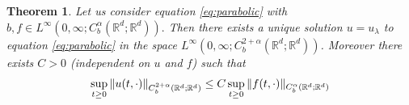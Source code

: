 \documentclass[a4paper,11pt]{article}
\newtheorem{theorem}{Theorem}
\begin{document}
\begin{theorem}
\label{schaud} Let us consider equation \eqref{eq:parabolic} with $b,f\in
L^{\infty }\left( 0,\infty ;C_{b}^{\alpha }({\mathbb{R}}^{d};{\mathbb{R}}%
^{d})\right) .$ Then there exists a unique solution $u=u_{\lambda }$ to
equation \eqref{eq:parabolic} in the space $L^{\infty }\left( 0,\infty
;C_{b}^{2+\alpha }({\mathbb{R}}^{d};{\mathbb{R}}^{d})\right) $. Moreover
there exists $C>0$ (independent on $u$ and $f$) such that
\begin{equation}
\sup_{t\geq 0}\Vert u(t,\cdot )\Vert _{C_{b}^{2+\alpha }({\mathbb{R}}^{d};{%
\mathbb{R}}^{d})}\leq C\sup_{t\geq 0}\Vert f(t,\cdot )\Vert _{C_{b}^{\alpha
}({\mathbb{R}}^{d};{\mathbb{R}}^{d})}  \label{stima}
\end{equation}
\end{theorem}
\end{document}
